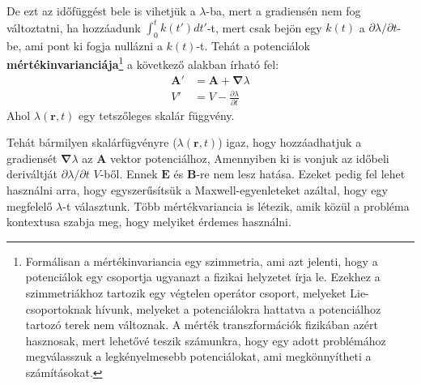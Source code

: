 \documentclass[../main.tex]{subfiles}
\begin{document}
De ezt az időfüggést bele is vihetjük a $\lambda$-ba, mert a gradiensén nem fog változtatni, ha hozzáadunk $\int_{0}^{t} k(t') dt'$-t, mert csak bejön egy $k(t)$ a $\partial \lambda / \partial t$-be, ami pont ki fogja nullázni a $k(t)$-t.
Tehát a potenciálok \textbf{mértékinvarianciája}\footnote{
    Formálisan a mértékinvariancia egy szimmetria, ami azt jelenti, hogy a potenciálok egy csoportja ugyanazt a fizikai helyzetet írja le. Ezekhez a szimmetriákhoz tartozik egy végtelen operátor csoport, melyeket Lie-csoportoknak hívunk, melyeket a potenciálokra hattatva a potenciálhoz tartozó terek nem változnak.
    A mérték transzformációk fizikában azért hasznosak, mert lehetővé teszik számunkra, hogy egy adott problémához megválasszuk a legkényelmesebb potenciálokat, ami megkönnyítheti a számításokat.
} a következő alakban írható fel:
\begin{equation}
    \boxed{\begin{aligned}
        \mathbf{A}' &= \mathbf{A} + \boldsymbol{\nabla} \lambda \\
        V' &= V - \frac{\partial \lambda}{\partial t}
    \end{aligned}}
\end{equation}
Ahol $\lambda(\mathbf{r},t)$ egy tetszőleges skalár függvény. 

Tehát bármilyen skalárfügvényre ($\lambda(\mathbf{r},t)$) igaz, hogy hozzáadhatjuk a gradiensét $\boldsymbol{\nabla} \lambda$ az $\mathbf{A}$ vektor potenciálhoz, Amennyiben ki is vonjuk az időbeli deriváltját $\partial \lambda / \partial t$ $V$-ből. 
Ennek $\mathbf{E}$ és $\mathbf{B}$-re nem lesz hatása. Ezeket pedig fel lehet használni arra, hogy egyszerűsítsük a Maxwell-egyenleteket azáltal, hogy egy megfelelő $\lambda$-t választunk.
Több mértékvariancia is létezik, amik közül a probléma kontextusa szabja meg, hogy melyiket érdemes használni.
\end{document}
